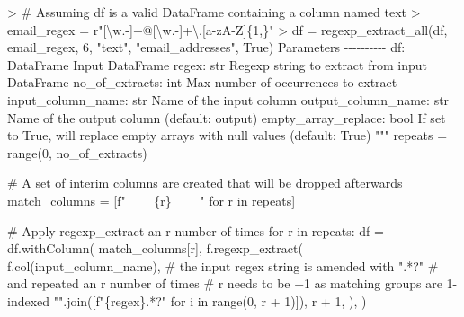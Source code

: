 \documentclass[
  letterpaper,
  DIV=11,
  numbers=noendperiod]{scrreprt}
\newenvironment{Shaded}{\begin{snugshade}}{\end{snugshade}}
\newcommand{\BuiltInTok}[1]{\textcolor[rgb]{0.00,0.23,0.31}{#1}}
\newcommand{\CommentTok}[1]{\textcolor[rgb]{0.37,0.37,0.37}{#1}}
\newcommand{\ControlFlowTok}[1]{\textcolor[rgb]{0.00,0.23,0.31}{#1}}
\newcommand{\DecValTok}[1]{\textcolor[rgb]{0.68,0.00,0.00}{#1}}
\newcommand{\KeywordTok}[1]{\textcolor[rgb]{0.00,0.23,0.31}{#1}}
\newcommand{\NormalTok}[1]{\textcolor[rgb]{0.00,0.23,0.31}{#1}}
\newcommand{\OperatorTok}[1]{\textcolor[rgb]{0.37,0.37,0.37}{#1}}
\newcommand{\SpecialCharTok}[1]{\textcolor[rgb]{0.37,0.37,0.37}{#1}}
\newcommand{\SpecialStringTok}[1]{\textcolor[rgb]{0.13,0.47,0.30}{#1}}
\newcommand{\StringTok}[1]{\textcolor[rgb]{0.13,0.47,0.30}{#1}}
\begin{document}
\begin{Shaded}
\begin{Highlighting}[]
\CommentTok{    }
\CommentTok{    \textgreater{} \# Assuming \textasciigrave{}df\textasciigrave{} is a valid DataFrame containing a column named \textasciigrave{}text\textasciigrave{}}
\CommentTok{    \textgreater{} email\_regex = r"[\textbackslash{}w.{-}]+@[\textbackslash{}w.{-}]+\textbackslash{}.[a{-}zA{-}Z]\{1,\}"}
\CommentTok{    \textgreater{} df = regexp\_extract\_all(df, email\_regex, 6, "text", "email\_addresses", True)}
\CommentTok{    }
\CommentTok{    Parameters}
\CommentTok{    {-}{-}{-}{-}{-}{-}{-}{-}{-}{-}}
\CommentTok{    df: DataFrame}
\CommentTok{        Input DataFrame}
\CommentTok{    }
\CommentTok{    regex: str}
\CommentTok{        Regexp string to extract from input DataFrame}
\CommentTok{    }
\CommentTok{    no\_of\_extracts: int}
\CommentTok{        Max number of occurrences to extract}
\CommentTok{    }
\CommentTok{    input\_column\_name: str}
\CommentTok{        Name of the input column}
\CommentTok{    }
\CommentTok{    output\_column\_name: str}
\CommentTok{        Name of the output column (default: output)}
\CommentTok{    }
\CommentTok{    empty\_array\_replace: bool}
\CommentTok{        If set to True, will replace empty arrays with null values (default: True)}
\CommentTok{    """}
\NormalTok{    repeats }\OperatorTok{=} \BuiltInTok{range}\NormalTok{(}\DecValTok{0}\NormalTok{, no\_of\_extracts)}

    \CommentTok{\# A set of interim columns are created that will be dropped afterwards}
\NormalTok{    match\_columns }\OperatorTok{=}\NormalTok{ [}\SpecialStringTok{f"\_\_\_}\SpecialCharTok{\{}\NormalTok{r}\SpecialCharTok{\}}\SpecialStringTok{\_\_\_"} \ControlFlowTok{for}\NormalTok{ r }\KeywordTok{in}\NormalTok{ repeats]}

    \CommentTok{\# Apply regexp\_extract an r number of times}
    \ControlFlowTok{for}\NormalTok{ r }\KeywordTok{in}\NormalTok{ repeats:}
\NormalTok{        df }\OperatorTok{=}\NormalTok{ df.withColumn(}
\NormalTok{            match\_columns[r],}
\NormalTok{            f.regexp\_extract(}
\NormalTok{                f.col(input\_column\_name),}
                \CommentTok{\# the input regex string is amended with ".*?"}
                \CommentTok{\# and repeated an r number of times}
                \CommentTok{\# r needs to be +1 as matching groups are 1{-}indexed}
                \StringTok{""}\NormalTok{.join([}\SpecialStringTok{f"}\SpecialCharTok{\{}\NormalTok{regex}\SpecialCharTok{\}}\SpecialStringTok{.*?"} \ControlFlowTok{for}\NormalTok{ i }\KeywordTok{in} \BuiltInTok{range}\NormalTok{(}\DecValTok{0}\NormalTok{, r }\OperatorTok{+} \DecValTok{1}\NormalTok{)]),}
\NormalTok{                r }\OperatorTok{+} \DecValTok{1}\NormalTok{,}
\NormalTok{            ),}
\NormalTok{        )}


\end{Highlighting}
\end{Shaded}
\end{document}
